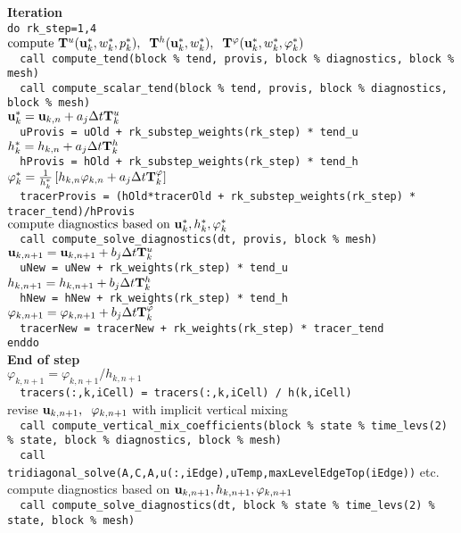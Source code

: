 \documentclass[11pt]{report}
\begin{document}
{\bf Iteration}\\
\verb|do rk_step=1,4|\\
$\mbox{compute } {\bf T}^u({\bf u}_k^*,w_k^*,p_k^*), \;\;
{\bf T}^h({\bf u}_k^*,w_k^*), \;\;
{\bf T}^\varphi({\bf u}_k^*,w_k^*,\varphi_k^*) $\\
\verb|  call compute_tend(block % tend, provis, block % diagnostics, block % mesh)|\\
\verb|  call compute_scalar_tend(block % tend, provis, block % diagnostics, block % mesh)|\\
${\bf u}^*_k = {\bf u}_{k,n} + a_j \Delta t {\bf T}^u_k $\\ 
\verb|  uProvis = uOld + rk_substep_weights(rk_step) * tend_u|\\
$h^*_k = h_{k,n} + a_j \Delta t {\bf T}^h_k $\\
\verb|  hProvis = hOld + rk_substep_weights(rk_step) * tend_h|\\
${\varphi}_k^* = \frac{1}{h_k^*} \left[
h_{k,n} \varphi_{k,n} 
+ a_j \Delta t  {\bf T}^\varphi_k \right]$\\
\verb|  tracerProvis = (hOld*tracerOld + rk_substep_weights(rk_step) * tracer_tend)/hProvis|\\
$\mbox{compute diagnostics based on }{\bf u}_k^*,h_k^*,\varphi_k^* $\\
\verb|  call compute_solve_diagnostics(dt, provis, block % mesh)|\\
${\bf u}_{k,n+1} = {\bf u}_{k,n+1} + b_j \Delta t {\bf T}^u_k $\\
\verb|  uNew = uNew + rk_weights(rk_step) * tend_u|\\
$h_{k,n+1} = h_{k,n+1} + b_j \Delta t {\bf T}^h_k $\\
\verb|  hNew = hNew + rk_weights(rk_step) * tend_h|\\
${\varphi}_{k,n+1} =  \varphi_{k,n+1} 
+ b_j \Delta t  {\bf T}^\varphi_k $\\
\verb|  tracerNew = tracerNew + rk_weights(rk_step) * tracer_tend|\\
\verb|enddo|\\

{\bf End of step}\\
$\varphi_{k,n+1} =  \varphi_{k,n+1} / h_{k,n+1} $\\
\verb|  tracers(:,k,iCell) = tracers(:,k,iCell) / h(k,iCell)|\\
revise ${\bf u}_{k,n+1},\;\;\varphi_{k,n+1}$ with implicit vertical mixing\\
\verb|  call compute_vertical_mix_coefficients(block % state % time_levs(2) % state, block % diagnostics, block % mesh)|\\
\verb|  call tridiagonal_solve(A,C,A,u(:,iEdge),uTemp,maxLevelEdgeTop(iEdge))| etc.\\
compute diagnostics based on ${\bf u}_{k,n+1},h_{k,n+1},\varphi_{k,n+1}$\\
\verb|  call compute_solve_diagnostics(dt, block % state % time_levs(2) % state, block % mesh)|\\
\end{document}
